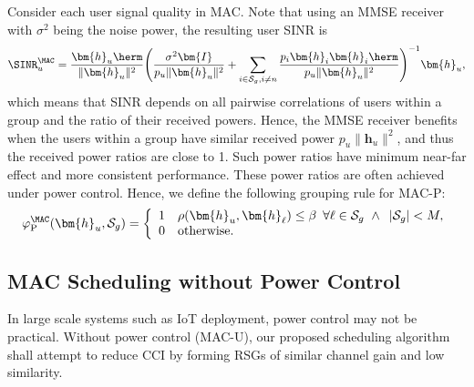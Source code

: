 Consider each user signal quality in MAC. 
Note that using an MMSE receiver with $\sigma^2$ being the noise power, the resulting user SINR is 
\begin{align*}
	\SINR_u^{\MAC} =
	\frac{\bm{h}_u\herm}{\|\bm{h}_u\|^2}\Bigg(\frac{\sigma^2\bm{I}}{p_u\|\bm{h}_u\|^2}+\sum_{i\in\mathcal{S}_g,i\neq n}\frac{p_i\bm{h}_i\bm{h}_i\herm}{p_u\|\bm{h}_u\|^2}\Bigg)^{-1}\bm{h}_u,
\end{align*}
which means that SINR depends on all pairwise correlations of users within a group and the ratio of their received powers. 
Hence, the MMSE receiver benefits when the users within a group have similar received power $p_u\|\bm{h}_u\|^2$, and thus the received power ratios are close to 1. 
Such power ratios have minimum near-far effect and more consistent performance. 
These power ratios are often achieved under power control. 
Hence, we define the following grouping rule for MAC-P:
\begin{align}
	\varphi _{\mathrm{P}}
	^{\MAC}(\bm{h}_u,\mathcal{S}_g)=\left\{\begin{array}{ll}1&
		\rho(\bm{h}_u,\bm{h}_{\ell})\leq\beta\,\,\,\forall \ell\in\mathcal{S}_g
		\,\,\wedge\,\,\, |\mathcal{S}_g|<M,
		\\0&\text{otherwise.}\end{array}\right.
	\label{usch:eqn:assignment_rule_macp}
\end{align}

\subsection{MAC Scheduling without Power Control} 

In large scale systems such as IoT deployment, power control may not be practical. 
Without power control (MAC-U), our proposed scheduling algorithm
shall attempt to reduce CCI by forming RSGs of similar channel gain 
and low similarity. 

